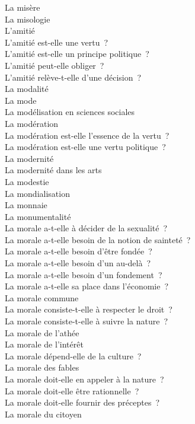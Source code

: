 \documentclass[a4paper,12pt]{article}
\begin{document}
La misère \\
La misologie \\
L'amitié \\
L'amitié est-elle une vertu ? \\
L'amitié est-elle un principe politique ? \\
L'amitié peut-elle obliger ? \\
L'amitié relève-t-elle d'une décision ? \\
La modalité \\
La mode \\
La modélisation en sciences sociales \\
La modération \\
La modération est-elle l'essence de la vertu ? \\
La modération est-elle une vertu politique ? \\
La modernité \\
La modernité dans les arts \\
La modestie \\
La mondialisation \\
La monnaie \\
La monumentalité \\
La morale a-t-elle à décider de la sexualité ? \\
La morale a-t-elle besoin de la notion de sainteté ? \\
La morale a-t-elle besoin d'être fondée ? \\
La morale a-t-elle besoin d'un au-delà ? \\
La morale a-t-elle besoin d'un fondement ? \\
La morale a-t-elle sa place dans l'économie ? \\
La morale commune \\
La morale consiste-t-elle à respecter le droit ? \\
La morale consiste-t-elle à suivre la nature ? \\
La morale de l'athée \\
La morale de l'intérêt \\
La morale dépend-elle de la culture ? \\
La morale des fables \\
La morale doit-elle en appeler à la nature ? \\
La morale doit-elle être rationnelle ? \\
La morale doit-elle fournir des préceptes ? \\
La morale du citoyen \\
\end{document}
